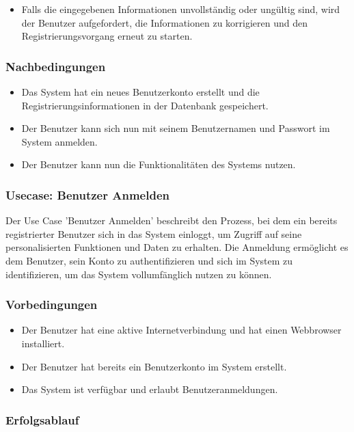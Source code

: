 \begin{itemize}
  \item Falls die eingegebenen Informationen unvollständig oder ungültig sind, wird der Benutzer aufgefordert, die Informationen zu korrigieren
   und den Registrierungsvorgang erneut zu starten.
\end{itemize}

\subsubsection*{Nachbedingungen}

\begin{itemize}
  \item Das System hat ein neues Benutzerkonto erstellt und die Registrierungsinformationen in der Datenbank gespeichert.
  \item Der Benutzer kann sich nun mit seinem Benutzernamen und Passwort im System anmelden.
  \item Der Benutzer kann nun die Funktionalitäten des Systems nutzen.
\end{itemize}

\subsubsection{Usecase: Benutzer Anmelden}

Der Use Case 'Benutzer Anmelden' beschreibt den Prozess, bei dem ein bereits registrierter Benutzer sich in das System einloggt,
um Zugriff auf seine personalisierten Funktionen und Daten zu erhalten. Die Anmeldung ermöglicht es dem Benutzer, 
sein Konto zu authentifizieren und sich im System zu identifizieren, um das System vollumfänglich nutzen zu können.

\subsubsection*{Vorbedingungen}

\begin{itemize}
  \item Der Benutzer hat eine aktive Internetverbindung und hat einen Webbrowser installiert.
  \item Der Benutzer hat bereits ein Benutzerkonto im System erstellt.
  \item Das System ist verfügbar und erlaubt Benutzeranmeldungen.
\end{itemize}

\subsubsection*{Erfolgsablauf}

